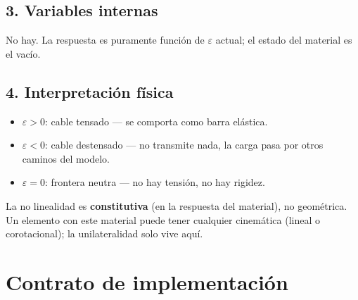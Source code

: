 \documentclass[11pt,letterpaper,oneside]{report}
\begin{document}
\subsection{3. Variables internas}
No hay. La respuesta es puramente función de $\varepsilon$ actual; el estado del material es el vacío.

\subsection{4. Interpretación física}
\begin{itemize}
  \item $\varepsilon > 0$: cable tensado --- se comporta como barra elástica.
  \item $\varepsilon < 0$: cable destensado --- no transmite nada, la carga pasa por otros caminos del modelo.
  \item $\varepsilon = 0$: frontera neutra --- no hay tensión, no hay rigidez.
\end{itemize}

La no linealidad es \textbf{constitutiva} (en la respuesta del material), no geométrica. Un elemento con este material puede tener cualquier cinemática (lineal o corotacional); la unilateralidad solo vive aquí.


\section{Contrato de implementación}
\end{document}
